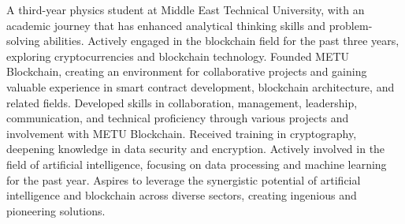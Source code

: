 

\begin{cvparagraph}

A third-year physics student at Middle East Technical University, with an academic journey that has enhanced analytical thinking skills and problem-solving abilities. Actively engaged in the blockchain field for the past three years, exploring cryptocurrencies and blockchain technology. Founded METU Blockchain, creating an environment for collaborative projects and gaining valuable experience in smart contract development, blockchain architecture, and related fields. Developed skills in collaboration, management, leadership, communication, and technical proficiency through various projects and involvement with METU Blockchain. Received training in cryptography, deepening knowledge in data security and encryption. Actively involved in the field of artificial intelligence, focusing on data processing and machine learning for the past year. Aspires to leverage the synergistic potential of artificial intelligence and blockchain across diverse sectors, creating ingenious and pioneering solutions.

\end{cvparagraph}
